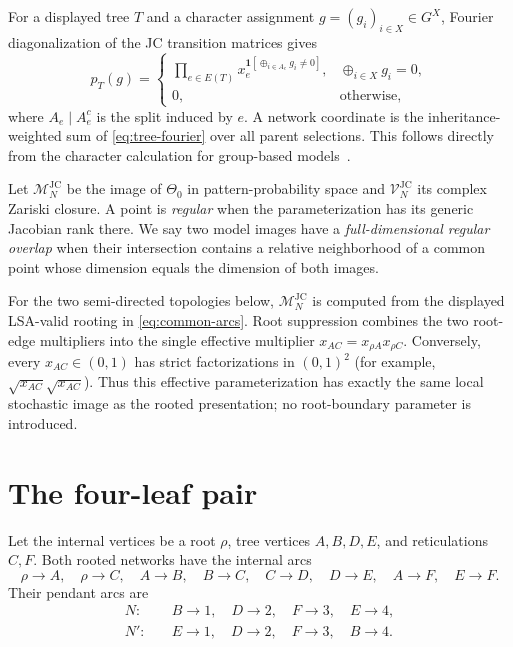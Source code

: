 \documentclass[11pt]{article}
\theoremstyle{remark}
\newcommand{\M}{\mathcal M}
\newcommand{\V}{\mathcal V}
\newcommand{\JC}{\mathrm{JC}}
\newcommand{\xor}{\mathbin\oplus}
\newcommand{\whp}{\widehat p}
\begin{document}
For a displayed tree $T$ and a character assignment
$g=(g_i)_{i\in X}\in G^X$, Fourier diagonalization of the JC transition
matrices gives
\begin{equation}\label{eq:tree-fourier}
\whp_T(g)=
\begin{cases}
\displaystyle\prod_{e\in E(T)}
x_e^{\mathbf1[\xor_{i\in A_e}g_i\ne0]},
&\xor_{i\in X}g_i=0,\\[2mm]
0,&\text{otherwise},
\end{cases}
\end{equation}
where $A_e\mid A_e^c$ is the split induced by $e$.  A network coordinate is
the inheritance-weighted sum of \eqref{eq:tree-fourier} over all parent
selections.  This follows directly from the character calculation for
group-based models~\cite{EvansSpeed1993,SturmfelsSullivant2005}.

Let $\M_N^{\JC}$ be the image of $\Theta_0$ in pattern-probability space and
$\V_N^{\JC}$ its complex Zariski closure.  A point is \emph{regular} when the
parameterization has its generic Jacobian rank there.  We say two model
images have a \emph{full-dimensional regular overlap} when their intersection
contains a relative neighborhood of a common point whose dimension equals
the dimension of both images.

For the two semi-directed topologies below, $\M_N^{\JC}$ is computed from the
displayed LSA-valid rooting in \eqref{eq:common-arcs}.  Root suppression
combines the two root-edge multipliers into the single effective multiplier
$x_{AC}=x_{\rho A}x_{\rho C}$.  Conversely, every
$x_{AC}\in(0,1)$ has strict factorizations in $(0,1)^2$ (for example,
$\sqrt{x_{AC}}\sqrt{x_{AC}}$).  Thus this effective parameterization has
exactly the same local stochastic image as the rooted presentation; no
root-boundary parameter is introduced.

\section{The four-leaf pair}

Let the internal vertices be a root $\rho$, tree vertices $A,B,D,E$, and
reticulations $C,F$.  Both rooted networks have the internal arcs
\begin{equation}\label{eq:common-arcs}
\rho\to A,\quad \rho\to C,\quad A\to B,\quad B\to C,
\quad C\to D,\quad D\to E,\quad A\to F,\quad E\to F.
\end{equation}
Their pendant arcs are
\begin{align}
N:&\quad B\to1,\quad D\to2,\quad F\to3,\quad E\to4,
\label{eq:N-pendants}\\
N':&\quad E\to1,\quad D\to2,\quad F\to3,\quad B\to4.
\label{eq:Np-pendants}
\end{align}
\end{document}
